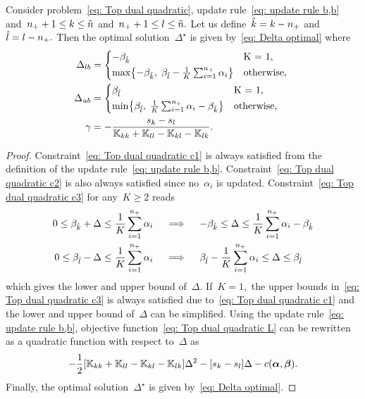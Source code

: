 \begin{lemma}\label{thm: toppushk family quadratic update b,b}
  Consider problem~\eqref{eq: Top dual quadratic}, update rule~\eqref{eq: update rule b,b} and~$n_{+} + 1 \leq k \leq \tilde{n}$ and~$n_{+} + 1 \leq l \leq \tilde{n}.$ Let us define~$\hat{k} = k - n_{+}$ and~$\hat{l} = l - n_{+}.$ Then the optimal solution~$\Delta^{\star}$ is given by~\eqref{eq: Delta optimal} where
  \begin{align*}
    \Delta_{lb} & = 
      \begin{cases*}
        -\betak & K = 1, \\
        \max \Brac[c]{- \betak,\; \betal - \frac{1}{K} \sum_{i = 1}^{\npos} \alpha_i} & \textrm{otherwise},
      \end{cases*} \\
    \Delta_{ub} & = 
      \begin{cases*}
        \betal & K = 1, \\
        \min \Brac[c]{\betal,\; \frac{1}{K} \sum_{i = 1}^{\npos} \alpha_i - \betak} & \textrm{otherwise},
      \end{cases*} \\
    \gamma & = -\frac{s_k - s_l}{\K_{kk} + \K_{ll} - \K_{kl} - \K_{lk}}.
  \end{align*}
\end{lemma}

\begin{proof}
  Constraint~\eqref{eq: Top dual quadratic c1} is always satisfied from the definition of the update rule~\eqref{eq: update rule b,b}. Constraint~\eqref{eq: Top dual quadratic c2} is also always satisfied since no~$\alpha_i$ is updated. Constraint~\eqref{eq: Top dual quadratic c3} for any~$K \geq 2$ reads
  \begin{align*}
    0 \leq \beta_{\hat{k}} + \Delta \leq \frac{1}{K} \sum_{i = 1}^{n_{+}} \alpha_i 
    & \quad \implies \quad
    -\beta_{\hat{k}} \leq \Delta \leq \frac{1}{K} \sum_{i = 1}^{n_{+}} \alpha_i - \beta_{\hat{k}} \\
    0 \leq \beta_{\hat{l}} - \Delta \leq \frac{1}{K} \sum_{i = 1}^{n_{+}} \alpha_i
    & \quad \implies \quad
    \beta_{\hat{l}} - \frac{1}{K} \sum_{i = 1}^{n_{+}} \alpha_i \leq \Delta \leq \beta_{\hat{l}}
  \end{align*}
  which gives the lower and upper bound of~$\Delta.$ If~$K = 1,$ the upper bounds in~\eqref{eq: Top dual quadratic c3} is always satisfied due to~\eqref{eq: Top dual quadratic c1} and the lower and upper bound of~$\Delta$ can be simplified. Using the update rule~\eqref{eq: update rule b,b}, objective function~\eqref{eq: Top dual quadratic L} can be rewritten as a quadratic function with respect to~$\Delta$ as
  \begin{equation*}
    - \frac{1}{2} \Brac[s]{\K_{kk} + \K_{ll} - \K_{kl} - \K_{lk}} \Delta^2
    - \Brac[s]{s_k - s_l} \Delta
    - c(\bm{\alpha}, \bm{\beta}).
  \end{equation*}
  Finally, the optimal solution~$\Delta^{\star}$ is given by~\eqref{eq: Delta optimal}.
\end{proof}

